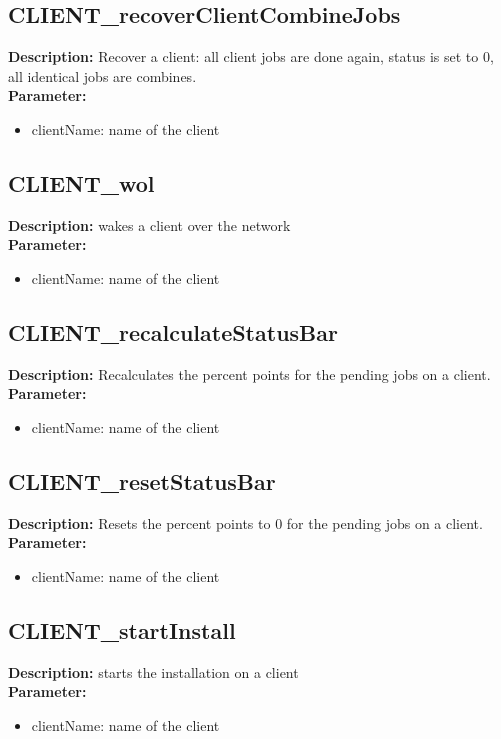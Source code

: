 \subsection{CLIENT\_recoverClientCombineJobs}
\textbf{Description:} Recover a client: all client jobs are done again, status is set to 0, all identical jobs are combines.\\
\textbf{Parameter:}
\begin{itemize}
\item clientName: name of the client
\end{itemize}

\subsection{CLIENT\_wol}
\textbf{Description:} wakes a client over the network\\
\textbf{Parameter:}
\begin{itemize}
\item clientName: name of the client
\end{itemize}

\subsection{CLIENT\_recalculateStatusBar}
\textbf{Description:} Recalculates the percent points for the pending jobs on a client.\\
\textbf{Parameter:}
\begin{itemize}
\item clientName: name of the client
\end{itemize}

\subsection{CLIENT\_resetStatusBar}
\textbf{Description:} Resets the percent points to 0 for the pending jobs on a client.\\
\textbf{Parameter:}
\begin{itemize}
\item clientName: name of the client
\end{itemize}

\subsection{CLIENT\_startInstall}
\textbf{Description:} starts the installation on a client\\
\textbf{Parameter:}
\begin{itemize}
\item clientName: name of the client
\end{itemize}

